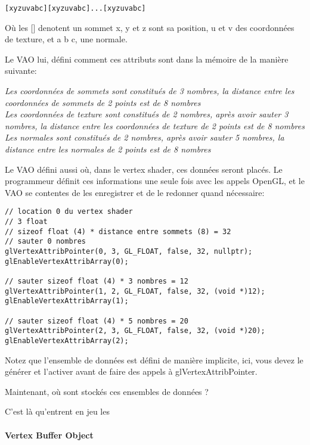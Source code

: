 \documentclass[11pt, a4paper, titlepage]{article}
\begin{document}
\begin{alltt}
[x y z u v a b c][x y z u v a b c]...[x y z u v a b c]
\end{alltt}
Où les [] denotent un sommet x, y et z sont sa position, u et v des coordonnées de texture, et a b c, une normale.

Le VAO lui, défini comment ces attributs sont dans la mémoire de la manière suivante:

\emph{Les coordonnées de sommets sont constitués de 3 nombres, la distance entre les coordonnées de sommets de 2 points est de 8 nombres\\}
\emph{Les coordonnées de texture sont constitués de 2 nombres, après avoir sauter 3 nombres, la distance entre les coordonnées de texture de 2 points est de 8 nombres\\}
\emph{Les normales sont constitués de 2 nombres, après avoir sauter 5 nombres, la distance entre les normales de 2 points est de 8 nombres\\}

Le VAO défini aussi où, dans le vertex shader, ces données seront placés.
Le programmeur définit ces informations une seule fois avec les appels OpenGL, et le VAO se contentes de les enregistrer et de le redonner quand nécessaire:

\begin{lstlisting}
// location 0 du vertex shader
// 3 float
// sizeof float (4) * distance entre sommets (8) = 32
// sauter 0 nombres
glVertexAttribPointer(0, 3, GL_FLOAT, false, 32, nullptr);
glEnableVertexAttribArray(0);

// sauter sizeof float (4) * 3 nombres = 12
glVertexAttribPointer(1, 2, GL_FLOAT, false, 32, (void *)12);
glEnableVertexAttribArray(1);

// sauter sizeof float (4) * 5 nombres = 20
glVertexAttribPointer(2, 3, GL_FLOAT, false, 32, (void *)20);
glEnableVertexAttribArray(2);
\end{lstlisting}

Notez que l'ensemble de données est défini de manière implicite, ici, vous devez le générer et l'activer avant de faire des appels à glVertexAttribPointer.

Maintenant, où sont stockés ces ensembles de données ?

C'est là qu'entrent en jeu les

\paragraph{Vertex Buffer Object\\}
\end{document}

